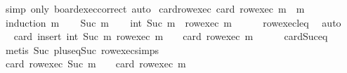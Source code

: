 \begin{isabellebody}
\ {\isacharparenleft}{\kern0pt}simp\ only{\isacharcolon}{\kern0pt}\ board{\isacharunderscore}{\kern0pt}exec{\isacharunderscore}{\kern0pt}correct{\isacharparenright}{\kern0pt}\ auto%
\endisatagproof
{\isafoldproof}%
%
\isadelimproof
\isanewline
%
\endisadelimproof
\isanewline
{}\isamarkupfalse%
\ card{\isacharunderscore}{\kern0pt}row{\isacharunderscore}{\kern0pt}exec{\isacharcolon}{\kern0pt}\ {\isachardoublequoteopen}card\ {\isacharparenleft}{\kern0pt}row{\isacharunderscore}{\kern0pt}exec\ m{\isacharparenright}{\kern0pt}\ {\isacharequal}{\kern0pt}\ m{\isachardoublequoteclose}\isanewline
%
\isadelimproof
%
\endisadelimproof
%
\isatagproof
{}\isamarkupfalse%
\ {\isacharparenleft}{\kern0pt}induction\ m{\isacharparenright}{\kern0pt}\isanewline
\ \ \isamarkupfalse%
\ {\isacharparenleft}{\kern0pt}Suc\ m{\isacharparenright}{\kern0pt}\isanewline
\ \ \isamarkupfalse%
\ {\isachardoublequoteopen}int\ {\isacharparenleft}{\kern0pt}Suc\ m{\isacharparenright}{\kern0pt}\ {\isasymnotin}\ row{\isacharunderscore}{\kern0pt}exec\ m{\isachardoublequoteclose}\isanewline
\ \ \ \ \isamarkupfalse%
\ row{\isacharunderscore}{\kern0pt}exec{\isacharunderscore}{\kern0pt}leq\ \isamarkupfalse%
\ auto\isanewline
\ \ \isamarkupfalse%
\ \isamarkupfalse%
\ {\isachardoublequoteopen}card\ {\isacharparenleft}{\kern0pt}insert\ {\isacharparenleft}{\kern0pt}int\ {\isacharparenleft}{\kern0pt}Suc\ m{\isacharparenright}{\kern0pt}{\isacharparenright}{\kern0pt}\ {\isacharparenleft}{\kern0pt}row{\isacharunderscore}{\kern0pt}exec\ m{\isacharparenright}{\kern0pt}{\isacharparenright}{\kern0pt}\ {\isacharequal}{\kern0pt}\ {}\ {\isacharplus}{\kern0pt}\ card\ {\isacharparenleft}{\kern0pt}row{\isacharunderscore}{\kern0pt}exec\ m{\isacharparenright}{\kern0pt}{\isachardoublequoteclose}\isanewline
\ \ \ \ \isamarkupfalse%
\ card{\isacharunderscore}{\kern0pt}Suc{\isacharunderscore}{\kern0pt}eq\ \isamarkupfalse%
\ {\isacharparenleft}{\kern0pt}metis\ Suc\ plus{\isacharunderscore}{\kern0pt}{}{\isacharunderscore}{\kern0pt}eq{\isacharunderscore}{\kern0pt}Suc\ row{\isacharunderscore}{\kern0pt}exec{\isachardot}{\kern0pt}simps{\isacharparenleft}{\kern0pt}{}{\isacharparenright}{\kern0pt}{\isacharparenright}{\kern0pt}\isanewline
\ \ \isamarkupfalse%
\ \isamarkupfalse%
\ {\isachardoublequoteopen}card\ {\isacharparenleft}{\kern0pt}row{\isacharunderscore}{\kern0pt}exec\ {\isacharparenleft}{\kern0pt}Suc\ m{\isacharparenright}{\kern0pt}{\isacharparenright}{\kern0pt}\ {\isacharequal}{\kern0pt}\ {}\ {\isacharplus}{\kern0pt}\ card\ {\isacharparenleft}{\kern0pt}row{\isacharunderscore}{\kern0pt}exec\ m{\isacharparenright}{\kern0pt}{\isachardoublequoteclose}\isanewline

\end{isabellebody}

